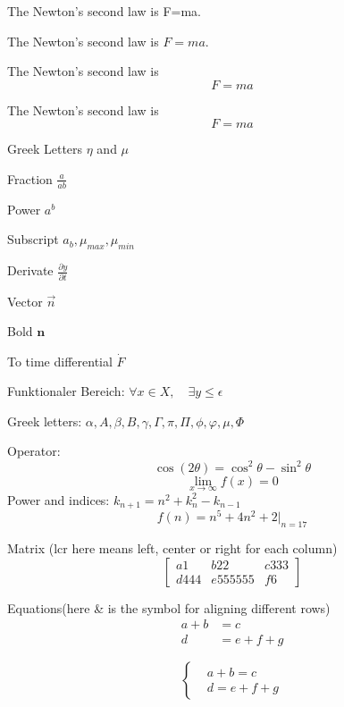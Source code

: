\documentclass{article}
\begin{document}
  The Newton's second law is F=ma.

  The Newton's second law is $F=ma$.

  The Newton's second law is
  $$F=ma$$

  The Newton's second law is
  \[F=ma\]

  Greek Letters $\eta$ and $\mu$

  Fraction $\frac{a}{ab}$

  Power $a^b$

  Subscript $a_b, \mu_{max}, \mu_{min}$

  Derivate $\frac{\partial y}{\partial t} $

  Vector $\vec{n}$

  Bold $\mathbf{n}$

  To time differential $\dot{F}$
  
  Funktionaler Bereich: $\forall x \in X, \quad\exists y\leq \epsilon$
  
  Greek letters: $\alpha, A, \beta, B, \gamma, \Gamma, \pi, \Pi, \phi, \varphi, \mu, \Phi$
  
  Operator: $$\cos(2\theta) = \cos^2\theta - \sin^2\theta$$
            $$\lim_{x\to\infty} f(x) = 0 $$
  Power and indices: $k_{n+1} = n^2 + k_n^2 - k_{n-1}$\\
                     $$f(n) = n^5 + 4n^2 + 2 |_{n=17}$$
              
  Matrix (lcr here means left, center or right for each column)
  \[
    \left[
      \begin{array}{lcr}
        a1 & b22 & c333 \\
        d444 & e555555 & f6
      \end{array}
    \right]
  \]

Equations(here \& is the symbol for aligning different rows)
\begin{align}
  a+b&=c\\
  d&=e+f+g
\end{align}

\[
  \left\{
    \begin{aligned}
      &a+b=c\\
      &d=e+f+g
    \end{aligned}
  \right.
\]
\end{document}
